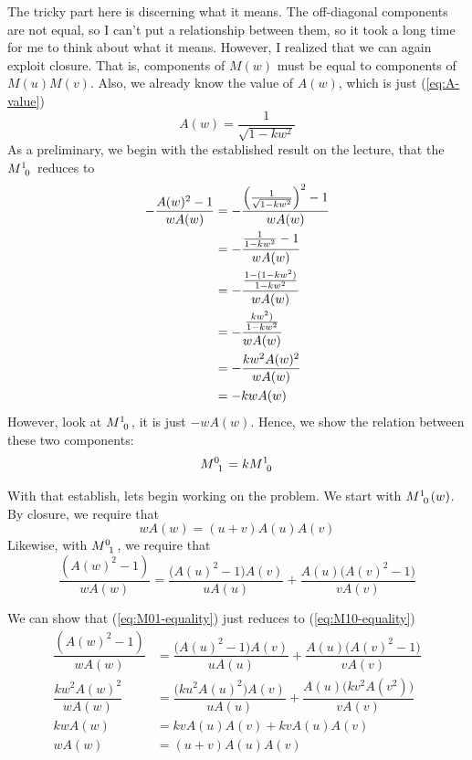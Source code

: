 \documentclass[12pt,a4paper]{article}
\begin{document}
\begin{solution_pset}
		The tricky part here is discerning what it means. The off-diagonal components are not equal, so 
		I can't put a relationship between them, so it took a long time for me to 
		think about what it means. However, I realized that we can again exploit closure.
		That is, components of $M(w)$ must be equal to components of $M(u) M(v)$.
		Also, we already know the value of $A(w)$, which is just (\ref{eq:A-value})
		\[
			A(w) = \frac{1}{\sqrt{1-kw^2}}
		\]
		As a preliminary, we begin with the established result on the lecture, that
		the $M\indices{^1_0}$ reduces to
		\begin{align*}
			-
		   \frac{A(w)^2 - 1}{w A(w)} 
		   &=
		   -
		   \frac{
			   \pqty{\frac{1}{\sqrt{1-kw^2}}}^2 - 1
		   }{w A(w)} \\
		   &=
		   -
		   \frac{
			   {\frac{1}{{1-kw^2}}} - 1
		   }{w A(w)} \\
		   &=
		   -
		   \frac{
			   {\frac{1 - (1-kw^2)}{{1-kw^2}}} 
		   }{w A(w)} \\
		   &=
		   -
		   \frac{
			   {\frac{kw^2)}{{1-kw^2}}} 
		   }{w A(w)} \\
		   &=
		   -
		   \frac{
			   kw^2 A(w)^2
		   }{w A(w)} \\
		   &=
		   -kw A(w)
		\end{align*}
		However, look at $M\indices{^1_0}$, it is just $-w A(w)$.
		Hence, we show the relation between these two components:
		\begin{equation}
			\label{eq:M01-M10 relation}
			M\indices{^0_1} 
			=
			k
			M\indices{^1_0} 
		\end{equation}
		
		With that establish, lets begin working on the problem.
		We start with $M\indices{^1_0}(w)$. By closure, we require that
		\begin{equation}
			\label{eq:M10-equality}
		    w A(w) = (u + v) A(u) A(v)
		\end{equation}
		Likewise, with $M\indices{^0_1}$, we require that
		\begin{equation}
			\label{eq:M01-equality}
			\dfrac{(A(w)^2-1)}{wA(w)} 
			=
			\dfrac{\bigl(A(u)^2-1\bigr)A(v)}{uA(u)} + \dfrac{A(u)\bigl(A(v)^2-1\bigr)}{vA(v)}  
		\end{equation}
		
		We can show that (\ref{eq:M01-equality}) just 
		reduces to (\ref{eq:M10-equality})
		\begin{align*}
			\dfrac{(A(w)^2-1)}{wA(w)} 
			&=
			\dfrac{\bigl(A(u)^2-1\bigr)A(v)}{uA(u)} 
			+
			\dfrac{A(u)\bigl(A(v)^2-1\bigr)}{vA(v)} \\
			\dfrac{kw^2A(w)^2}{wA(w)} 
			&=
			\dfrac{\bigl(ku^2 A(u)^2 \bigr)A(v)}{uA(u)} 
			+
			\dfrac{A(u)\bigl(kv^2 A(v^2)\bigr)}{vA(v)} \\
			kwA(w)
			&=
			kvA(u)A(v)
			+
			kvA(u)A(v)\\
			wA(w)
			&=
			(u+v)
			A(u) A(v)
		\end{align*}


\end{solution_pset}
\end{document}
